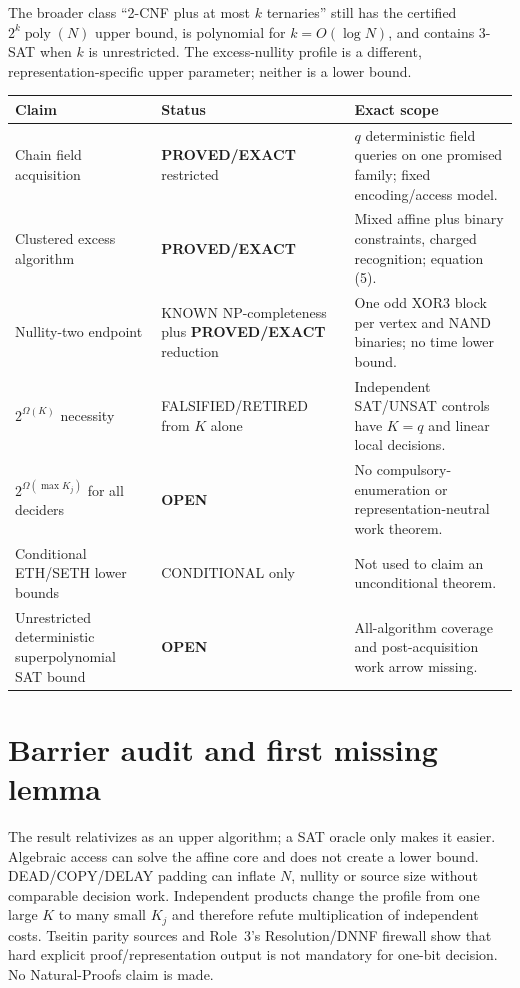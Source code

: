 \documentclass[11pt]{article}
\newcommand{\poly}{\operatorname{poly}}
\newcommand{\PROVED}{\textbf{PROVED/EXACT}}
\newcommand{\OPEN}{\textbf{OPEN}}
\begin{document}
The broader class ``2-CNF plus at most $k$ ternaries'' still has the certified
$2^k\poly(N)$ upper bound, is polynomial for $k=O(\log N)$, and contains
3-SAT when $k$ is unrestricted.  The excess-nullity profile is a different,
representation-specific upper parameter; neither is a lower bound.

\begin{longtable}{p{.19\linewidth}p{.18\linewidth}p{.52\linewidth}}
\toprule
Claim & Status & Exact scope\\\midrule\endhead
Chain field acquisition & \PROVED{} restricted & $q$ deterministic field queries on one promised family; fixed encoding/access model.\\
Clustered excess algorithm & \PROVED{} & Mixed affine plus binary constraints, charged recognition; equation (5).\\
Nullity-two endpoint & KNOWN NP-completeness plus \PROVED{} reduction & One odd XOR3 block per vertex and NAND binaries; no time lower bound.\\
$2^{\Omega(K)}$ necessity & FALSIFIED/RETIRED from $K$ alone & Independent SAT/UNSAT controls have $K=q$ and linear local decisions.\\
$2^{\Omega(\max K_j)}$ for all deciders & \OPEN{} & No compulsory-enumeration or representation-neutral work theorem.\\
Conditional ETH/SETH lower bounds & CONDITIONAL only & Not used to claim an unconditional theorem.\\
Unrestricted deterministic superpolynomial SAT bound & \OPEN{} & All-algorithm coverage and post-acquisition work arrow missing.\\
\bottomrule
\end{longtable}

\section{Barrier audit and first missing lemma}
The result relativizes as an upper algorithm; a SAT oracle only makes it
easier.  Algebraic access can solve the affine core and does not create a
lower bound.  DEAD/COPY/DELAY padding can inflate $N$, nullity or source size
without comparable decision work.  Independent products change the profile
from one large $K$ to many small $K_j$ and therefore refute multiplication of
independent costs.  Tseitin parity sources and Role~3's Resolution/DNNF
firewall show that hard explicit proof/representation output is not mandatory
for one-bit decision.  No Natural-Proofs claim is made.
\end{document}
